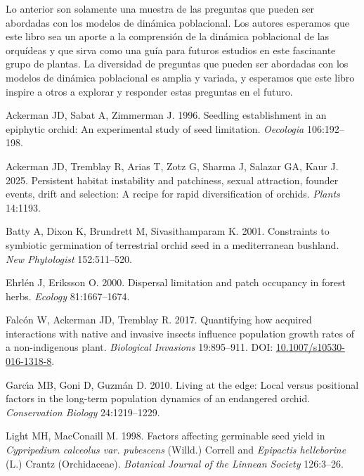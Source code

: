 \documentclass[
  12pt,
  letterpaper,
]{book}
\newlength{\cslhangindent}
\newenvironment{CSLReferences}[2] %
 {\begin{list}{}{%
  \setlength{\itemindent}{0pt}
  \setlength{\leftmargin}{0pt}
  \setlength{\parsep}{0pt}
  \ifodd #1
   \setlength{\leftmargin}{\cslhangindent}
   \setlength{\itemindent}{-1\cslhangindent}
  \fi
  \setlength{\itemsep}{#2\baselineskip}}}
 {\end{list}}
\begin{document}
Lo anterior son solamente una muestra de las preguntas que pueden ser
abordadas con los modelos de dinámica poblacional. Los autores esperamos
que este libro sea un aporte a la comprensión de la dinámica poblacional
de las orquídeas y que sirva como una guía para futuros estudios en este
fascinante grupo de plantas. La diversidad de preguntas que pueden ser
abordadas con los modelos de dinámica poblacional es amplia y variada, y
esperamos que este libro inspire a otros a explorar y responder estas
preguntas en el futuro.

\label{refs}
\begin{CSLReferences}{1}{0}
Ackerman JD, Sabat A, Zimmerman J. 1996. Seedling establishment in an
epiphytic orchid: An experimental study of seed limitation.
\emph{Oecologia} 106:192--198.

Ackerman JD, Tremblay R, Arias T, Zotz G, Sharma J, Salazar GA, Kaur J.
2025. Persistent habitat instability and patchiness, sexual attraction,
founder events, drift and selection: A recipe for rapid diversification
of orchids. \emph{Plants} 14:1193.

Batty A, Dixon K, Brundrett M, Sivasithamparam K. 2001. Constraints to
symbiotic germination of terrestrial orchid seed in a mediterranean
bushland. \emph{New {P}hytologist} 152:511--520.

Ehrlén J, Eriksson O. 2000. Dispersal limitation and patch occupancy in
forest herbs. \emph{Ecology} 81:1667--1674.

Falcón W, Ackerman JD, Tremblay R. 2017. Quantifying how acquired
interactions with native and invasive insects influence population
growth rates of a non-indigenous plant. \emph{Biological Invasions}
19:895--911. DOI:
\href{https://doi.org/10.1007/s10530-016-1318-8}{10.1007/s10530-016-1318-8}.

Garcı́a MB, Goni D, Guzmán D. 2010. Living at the edge: Local versus
positional factors in the long-term population dynamics of an endangered
orchid. \emph{Conservation Biology} 24:1219--1229.

Light MH, MacConaill M. 1998. Factors affecting germinable seed yield in
\emph{{C}ypripedium calceolus var. {p}ubescens} ({W}illd.) {C}orrell and
\emph{{E}pipactis helleborine} ({L}.) {C}rantz ({O}rchidaceae).
\emph{Botanical Journal of the Linnean Society} 126:3--26.


\end{CSLReferences}
\end{document}

